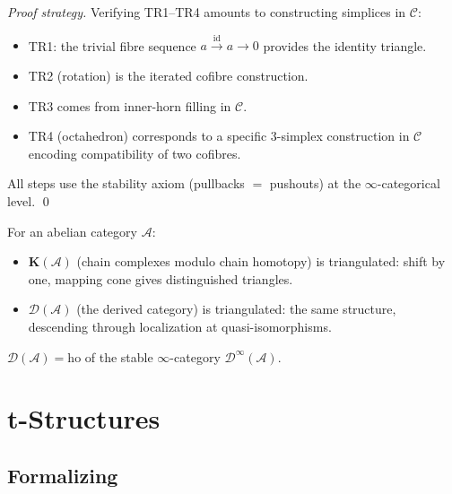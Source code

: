 \begin{proof}[Proof strategy]
Verifying TR1–TR4 amounts to constructing simplices in $\mathcal{C}$:
\begin{itemize}
  \item TR1: the trivial fibre sequence $a \xrightarrow{\mathrm{id}} a \to 0$ provides the
        identity triangle.
  \item TR2 (rotation) is the iterated cofibre construction.
  \item TR3 comes from inner-horn filling in $\mathcal{C}$.
  \item TR4 (octahedron) corresponds to a specific $3$-simplex construction
        in $\mathcal{C}$ encoding compatibility of two cofibres.
\end{itemize}
All steps use the stability axiom (pullbacks $=$ pushouts) at the
$\infty$-categorical level.
\qed
\end{proof}

\begin{example_thm}
\label{ex:K-D-triangulated}
For an abelian category $\mathcal{A}$:
\begin{itemize}
  \item $\mathbf{K}(\mathcal{A})$ (chain complexes modulo chain homotopy)
        is triangulated: shift by one, mapping cone gives distinguished
        triangles.
  \item $\mathcal{D}(\mathcal{A})$ (the derived category) is triangulated:
        the same structure, descending through localization at
        quasi-isomorphisms.
\end{itemize}
$\mathcal{D}(\mathcal{A}) = \mathrm{ho}$ of the stable $\infty$-category
$\mathcal{D}^\infty(\mathcal{A})$.
\end{example_thm}


\section{t-Structures}
\label{sec:t-structures}

\subsection{Formalizing}

